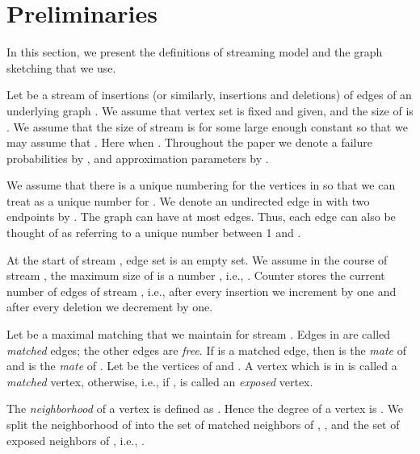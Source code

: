 \documentclass[11pt,letter]{article}
\renewcommand{\paragraph}[1]{\medskip \noindent {\bf #1}}
\begin{document}
\section{Preliminaries}
\label{sec:prelims}



In this section, we present the definitions of streaming model and
the graph sketching that we use.







\paragraph{Streaming Model.}
Let  be a stream of insertions (or similarly, insertions and deletions) of edges of an underlying graph
. We assume that vertex set  is fixed and given, and the size of 
is . We assume that the size of stream  is  for some large
enough constant  so that we may assume that
.
Here  when .
Throughout the paper we denote a failure probabilities by , and
approximation parameters by .


We assume that there is a unique numbering for the vertices in
 so that we can treat  as a unique number  for .
We denote an undirected edge in  with two endpoints  by
. The graph  can
have at most  edges.
Thus, each edge can also be thought of as referring to a unique number
between 1 and .



At the start of stream , edge set  is an empty set.
We assume in the course of stream , the maximum size of  is a
number , i.e., . Counter  stores the current number of
edges of stream , i.e., after every insertion we increment  by one and
after every deletion we decrement  by one.


Let  be a maximal matching that we maintain for stream .
Edges in  are called \textit{matched} edges; the other edges are \textit{free}.
If  is a matched edge, then  is the \textit{mate} of  and  is the
\textit{mate} of . Let  be the vertices of  and
. A vertex  which is in  is called
a \textit{matched} vertex, otherwise, i.e., if ,  is called
an \textit{exposed} vertex.

The \textit{neighborhood} of a vertex  is defined as
. Hence the degree of a vertex
 is .
We split the neighborhood of  into the set
of matched neighbors of , , and the set
of exposed neighbors of , i.e.,
.
\end{document}
